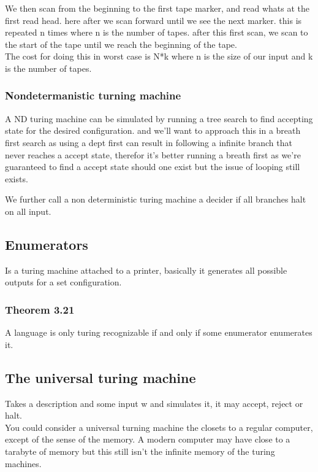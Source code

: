 \documentclass[a4paper,10pt,titlepage]{report}
\begin{document}
We then scan from the beginning to the first tape marker, and read whats at the first read head. here after we scan forward until we see the next marker. this is repeated n times where n is the number of tapes. after this first scan, we scan to the start of the tape until we reach the beginning of the tape.\\

The cost for doing this in worst case is N*k where n is the size of our input and k is the number of tapes.\\
\subsubsection{Nondetermanistic turning machine}
A ND turing machine can be simulated by running a tree search to find accepting state for the desired configuration. and we'll want to approach this in a breath first search as using a dept first can result in following a infinite branch that never reaches a accept state, therefor it's better running a breath first as we're guaranteed to find a accept state should one exist but the issue of looping still exists.

We further call a non deterministic turing machine a decider if all branches halt on all input.

\subsection{Enumerators}

Is a turing machine attached to a printer, basically it generates all possible outputs for a set configuration.

\subsubsection{Theorem 3.21}
A language is only turing recognizable if and only if some enumerator enumerates it.

\subsection{The universal turing machine}
Takes a description and some input w and simulates it, it may accept, reject or halt.\\

You could consider a universal turning machine the closets to a regular computer, except of the sense of the memory. A modern computer may have close to a tarabyte of memory but this still isn't the infinite memory of the turing machines.\\
\end{document}
